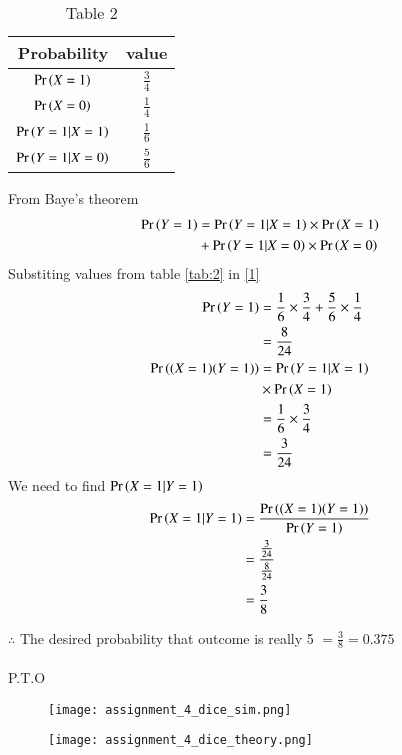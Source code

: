\documentclass[journal,12pt,twocolumn]{IEEEtran}
\begin{document}
\begin{table}[h!]
\resizebox{7cm}{!}
{ 
\begin{tabular}{|c|c|}
\hline
Probability & value \\
\hline
$\Pr\left(X=1\right)$ & $\frac{3}{4}$ \\
\hline
$\Pr\left(X=0\right)$ &  $\frac{1}{4}$ \\
 \hline
$\Pr\left(Y=1|X=1\right)$ & $\frac{1}{6}$ \\
\hline
$\Pr\left(Y=1|X=0\right)$  &  $\frac{5}{6}$ \\
\hline
\end{tabular}
}
\caption{Table 2} 
\label{tab:2}
\end{table}

From Baye's theorem
\begin{align}
\Pr\left(Y=1\right)&=\Pr\left(Y=1|X=1\right) \times \Pr\left(X=1\right) \notag \\
 & +\Pr\left(Y=1|X=0\right) \times \Pr\left(X=0\right)  \label{1}
\end{align}
Substiting values from table \eqref{tab:2} in \eqref{1}
\begin{align}
\Pr\left(Y=1\right) &= \frac{1}{6} \times \frac{3}{4}  + \frac{5}{6} \times \frac{1}{4} \\
&=\frac{8}{24} \label{2} \\
\Pr\left((X=1)(Y=1)\right)&= \Pr\left(Y=1|X=1\right) \notag \\
& \times \Pr\left(X=1\right) \\ 
&= \frac{1}{6} \times \frac{3}{4} \\
&= \frac{3}{24}  \label{3}
\end{align}
We need to find $\Pr\left(X=1|Y=1\right)$ 
\begin{align}
\Pr\left(X=1|Y=1\right) &= \frac{\Pr\left((X=1)(Y=1)\right)}{\Pr\left(Y=1\right)} \\
&= \frac{\frac{3}{24}}{\frac{8}{24}} \\
&=\frac{3}{8}
\end{align}

 $\therefore$ The desired probability that outcome is really 5 $= \frac{3}{8}=0.375$ \\ \\
 P.T.O \\
\begin{figure}[htb!]
\begin{center}
\texttt{[image: assignment\_4\_dice\_sim.png]}
\end{center}
\end{figure}

\begin{figure}[htb!]
\begin{center}
\texttt{[image: assignment\_4\_dice\_theory.png]}
\end{center}
\end{figure}
\end{document}
